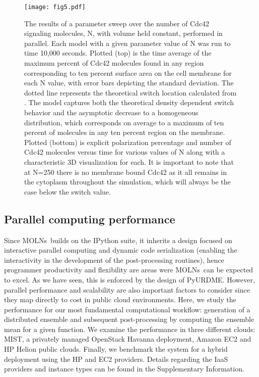 \documentclass[final,leqno,onefignum,onetabnum]{siamltex1213}
\def\packagename {MOLNs}
\begin{document}
\begin{figure}[htpb]
\begin{center}
\texttt{[image: fig5.pdf]}
\end{center}
\caption{
The results of a parameter sweep over the number of Cdc42 signaling molecules, N, with volume held constant, performed in parallel. Each model with a given parameter value of N was run to time 10,000 seconds. Plotted (top) is the time average of the maximum percent of Cdc42 molecules found in any region corresponding to ten percent surface area on the cell membrane for each N value, with error bars depicting the standard deviation. The dotted line represents the theoretical switch location calculated from \cite{Altschuler2011}. The model captures both the theoretical density dependent switch behavior and the asymptotic decrease to a homogeneous distribution, which corresponds on average to a maximum of ten percent of molecules in any ten percent region on the membrane. Plotted (bottom) is explicit polarization percentage and number of Cdc42 molecules versus time for various values of N along with a characteristic 3D visualization for each. It is important to note that at N=250 there is no membrane bound Cdc42 as it all remains in the cytoplasm throughout the simulation, which will always be the case below the switch value.}
\label{fig:polarization_percent}
\end{figure}






\subsection{Parallel computing performance}
\label{sec:benchmark}
Since \packagename~builds on the IPython suite, it inherits a design focused on interactive parallel computing and dynamic code serialization (enabling the interactivity in the development of the post-processing routines), hence programmer productivity and flexibility are areas were \packagename~can be expected to excel. As we have seen, this is enforced by the design of PyURDME. However, parallel performance and scalability are also important factors to consider since they map directly to cost in public cloud environments.
Here, we study the performance for our most fundamental computational workflow: generation of a distributed ensemble and subsequent post-processing by computing the ensemble mean for a given function. We examine the performance in three different clouds: MIST, a privately managed OpenStack Havanna deployment,  Amazon EC2 and HP Helion public clouds. Finally, we benchmark the system for a hybrid deployment using the HP and EC2 providers. Details regarding the IaaS providers and instance types can be found in the Supplementary Information.
\end{document}
